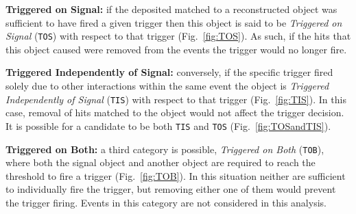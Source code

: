 \begin{description}
\item \textbf{Triggered on Signal:} if the deposited matched to a reconstructed object was sufficient to have fired a given trigger then this object is said to be \emph{Triggered on Signal} (\texttt{TOS}) with respect to that trigger (Fig.~\ref{fig:TOS}). As such, if the hits that this object caused were removed from the events the trigger would no longer fire.
\item \textbf{Triggered Independently of Signal:} conversely, if the specific trigger fired solely due to other interactions within the same event the object is \emph{Triggered Independently of Signal} (\texttt{TIS}) with respect to that trigger (Fig.~\ref{fig:TIS}). In this case, removal of hits matched to the object would not affect the trigger decision.  It is possible for a candidate to be both \texttt{TIS} and \texttt{TOS} (Fig.~\ref{fig:TOSandTIS}).
\item \textbf{Triggered on Both:} a third category is possible, \emph{Triggered on Both} (\texttt{TOB}), where both the signal object and another object are required to reach the threshold to fire a trigger (Fig.~\ref{fig:TOB}). In this situation neither are sufficient to individually fire the trigger, but removing either one of them would prevent the trigger firing. Events in this category are not considered in this analysis.
\end{description}

